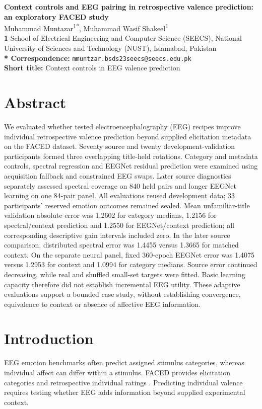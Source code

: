 \documentclass[10pt,letterpaper]{article}
\begin{document}
\begin{flushleft}
{\Large\textbf{Context controls and EEG pairing in retrospective valence prediction: an exploratory FACED study}}\\[12pt]
Muhammad Muntazar\textsuperscript{1*}, Muhammad Wasif Shakeel\textsuperscript{1}\\[8pt]
\textbf{1} School of Electrical Engineering and Computer Science (SEECS), National University of Sciences and Technology (NUST), Islamabad, Pakistan\\
\textbf{* Correspondence:} \nolinkurl{mmuntzar.bsds23seecs@seecs.edu.pk}\\
\textbf{Short title:} Context controls in EEG valence prediction
\end{flushleft}
\section*{Abstract}
We evaluated whether tested electroencephalography (EEG) recipes improve individual retrospective valence prediction beyond supplied elicitation metadata on the FACED dataset. Seventy source and twenty development-validation participants formed three overlapping title-held rotations. Category and metadata controls, spectral regression and EEGNet residual prediction were examined using acquisition fallback and constrained EEG swaps. Later source diagnostics separately assessed spectral coverage on 840 held pairs and longer EEGNet learning on one 84-pair panel. All evaluations reused development data; 33 participants' reserved emotion outcomes remained sealed. Mean unfamiliar-title validation absolute error was 1.2602 for category medians, 1.2156 for spectral/context prediction and 1.2550 for EEGNet/context prediction; all corresponding descriptive gain intervals included zero. In the later source comparison, distributed spectral error was 1.4455 versus 1.3665 for matched context. On the separate neural panel, fixed 360-epoch EEGNet error was 1.4075 versus 1.2953 for context and 1.0994 for category medians. Source error continued decreasing, while real and shuffled small-set targets were fitted. Basic learning capacity therefore did not establish incremental EEG utility. These adaptive evaluations support a bounded case study, without establishing convergence, equivalence to context or absence of affective EEG information.
\linenumbers
\section{Introduction}
EEG emotion benchmarks often predict assigned stimulus categories, whereas individual affect can differ within a stimulus. FACED provides elicitation categories and retrospective individual ratings \cite{chen2023faced}. Predicting individual valence requires testing whether EEG adds information beyond supplied experimental context.
\end{document}
